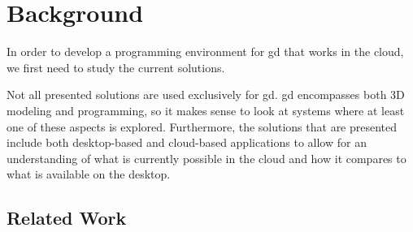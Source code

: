 
\section{Background}
\label{sec:background}


In order to develop a programming environment for \gls{gd} that works in the cloud, we first need to study the current solutions.

Not all presented solutions are used exclusively for \gls{gd}.
\gls{gd} encompasses both 3D modeling and programming, so it makes sense to look at systems where at least one of these aspects is explored.
Furthermore, the solutions that are presented include both desktop-based and cloud-based applications to allow for an understanding of what is currently possible in the cloud and how it compares to what is available on the desktop.



\subsection{Related Work}


